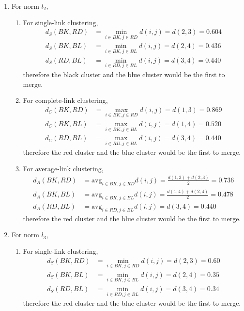 \documentclass[submit]{harvardml}
\begin{document}
\begin{enumerate}
    \item For norm $l_2$,
    \begin{enumerate}
        \item For single-link clustering,
        \begin{align*}
            d_S(BK, RD) &= \min_{i\in BK, j\in RD}d(i,j) = d(2,3) = 0.604 \\
            d_S(BK, BL) &= \min_{i\in BK, j\in BL}d(i,j) = d(2,4) = 0.436 \\
            d_S(RD, BL) &= \min_{i\in RD, j\in BL}d(i,j) = d(3,4) = 0.440
        \end{align*}
        therefore the black cluster and the blue cluster would be the first to merge.
        
        \item For complete-link clustering,
        \begin{align*}
            d_C(BK, RD) &= \max_{i\in BK, j\in RD}d(i,j) = d(1,3) = 0.869 \\
            d_C(BK, BL) &= \max_{i\in BK, j\in BL}d(i,j) = d(1,4) = 0.520 \\
            d_C(RD, BL) &= \max_{i\in RD, j\in BL}d(i,j) = d(3,4) = 0.440
        \end{align*}
        therefore the red cluster and the blue cluster would be the first to merge.
        
        \item For average-link clustering,
        \begin{align*}
            d_A(BK, RD) &= \text{avg}_{i\in BK, j\in RD}d(i,j) = \frac{d(1,3) + d(2,3)}{2} = 0.736 \\
            d_A(BK, BL) &= \text{avg}_{i\in BK, j\in BL}d(i,j) = \frac{d(1,4) + d(2,4)}{2} = 0.478 \\
            d_A(RD, BL) &= \text{avg}_{i\in RD, j\in BL}d(i,j) = d(3,4) = 0.440
        \end{align*}
        therefore the red cluster and the blue cluster would be the first to merge.
    \end{enumerate}
    
    \item For norm $l_3$,
    \begin{enumerate}
        \item For single-link clustering,
        \begin{align*}
            d_S(BK, RD) &= \min_{i\in BK, j\in RD}d(i,j) = d(2,3) = 0.60 \\
            d_S(BK, BL) &= \min_{i\in BK, j\in BL}d(i,j) = d(2,4) = 0.35 \\
            d_S(RD, BL) &= \min_{i\in RD, j\in BL}d(i,j) = d(3,4) = 0.34
        \end{align*}
        therefore the red cluster and the blue cluster would be the first to merge.
        

\end{enumerate}
\end{enumerate}
\end{document}
